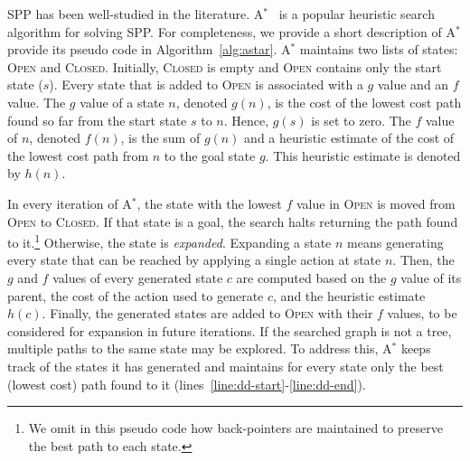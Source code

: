 \documentclass{aicom2e}
\newcommand{\astar}{A$^*$}
\newcommand{\open}{\textsc{Open}}
\newcommand{\closed}{\textsc{Closed}}
\newcommand{\roni}[1]{\textbf{[RS:#1]}}
\begin{document}
SPP has been well-studied in the literature. \astar{}~\cite{hartNR68Astar} is a popular
 heuristic search algorithm for solving SPP. For completeness, we provide a short description of \astar{} provide its pseudo code in Algorithm~\ref{alg:astar}. \astar{} maintains two lists of states: \open{} and
\closed{}. Initially, \closed{} is empty and \open{} contains only the start
state ($s$). Every state that is added to \open{} is associated with a $g$
value and an $f$ value. The $g$ value of a state $n$, denoted $g(n)$, is the
cost of the lowest cost path found so far from the start state $s$ to $n$.
Hence, $g(s)$ is set to zero. 
The $f$ value of $n$, denoted $f(n)$, is the sum
of $g(n)$ and a heuristic estimate of the cost of the lowest cost
path from $n$ to the goal state $g$. This heuristic estimate is denoted
by $h(n)$. %


In every iteration of \astar{}, the state with the lowest $f$ value in \open{}
is moved from \open{} to \closed{}. If that state is a goal, the search halts
returning the path found to it.\footnote{We omit in this pseudo code how
back-pointers are maintained to  preserve the best path to each state.}
Otherwise, the state is {\em expanded}. Expanding a state $n$ means generating
every state that can be reached by applying a single action at state $n$. Then,
the $g$ and $f$ values of every generated state $c$ are computed based on the
$g$ value of its parent, the cost of the action used to generate $c$, and the
heuristic estimate $h(c)$. Finally, the generated states are added to \open{}
with their $f$ values, to be considered for expansion in future iterations. If
the searched graph is not a tree, multiple paths to the same state may be
explored. To address this, \astar{} keeps track of the states it has generated 
and maintains for every state only the best (lowest cost) path found to it (lines~\ref{line:dd-start}-\ref{line:dd-end}).








\end{document}
